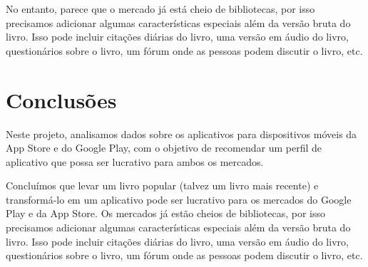 \documentclass[11pt]{article}
\begin{document}
No entanto, parece que o mercado já está cheio de bibliotecas, por isso
precisamos adicionar algumas características especiais além da versão
bruta do livro. Isso pode incluir citações diárias do livro, uma versão
em áudio do livro, questionários sobre o livro, um fórum onde as pessoas
podem discutir o livro, etc.

\section{Conclusões}\label{conclusuxf5es}

Neste projeto, analisamos dados sobre os aplicativos para dispositivos
móveis da App Store e do Google Play, com o objetivo de recomendar um
perfil de aplicativo que possa ser lucrativo para ambos os mercados.

Concluímos que levar um livro popular (talvez um livro mais recente) e
transformá-lo em um aplicativo pode ser lucrativo para os mercados do
Google Play e da App Store. Os mercados já estão cheios de bibliotecas,
por isso precisamos adicionar algumas características especiais além da
versão bruta do livro. Isso pode incluir citações diárias do livro, uma
versão em áudio do livro, questionários sobre o livro, um fórum onde as
pessoas podem discutir o livro, etc.


    
    
    
    
\end{document}
